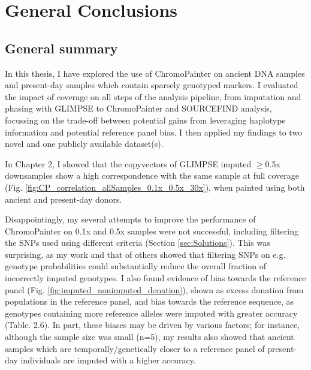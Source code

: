 \chapter{General Conclusions}
\label{chapterlabelConclusions}

\section{General summary}

In this thesis, I have explored the use of ChromoPainter on ancient DNA samples and present-day samples which contain sparsely genotyped markers. I evaluated the impact of coverage on all steps of the analysis pipeline, from imputation and phasing with GLIMPSE \cite{rubinacci2021efficient} to ChromoPainter and SOURCEFIND analysis, focussing on the trade-off between potential gains from leveraging haplotype information and potential reference panel bias. I then applied my findings to two novel and one publicly available dataset(s). 

In Chapter 2, I showed that the copyvectors of GLIMPSE imputed $\geq$0.5x downsamples show a high correspondence with the same sample at full coverage (Fig. \ref{fig:CP_correlation_allSamples_0.1x_0.5x_30x}), when painted using both ancient and present-day donors. 

Disappointingly, my several attempts to improve the performance of ChromoPainter on 0.1x and 0.5x samples were not successful, including filtering the SNPs used using different criteria (Section \ref{sec:Solutions}). This was surprising, as my work and that of others \cite{hui2020evaluating} showed that filtering SNPs on e.g. genotype probabilities could substantially reduce the overall fraction of incorrectly imputed genotypes. I also found evidence of bias towards the reference panel (Fig. \ref{fig:imputed_nonimputed_donation}), shown as excess donation from populations in the reference panel, and bias towards the reference sequence, as genotypes containing more reference alleles were imputed with greater accuracy (Table. 2.6). In part, these biases may be driven by various factors; for instance, although the sample size was small (n=5), my results also showed that ancient samples which are temporally/genetically closer to a reference panel of present-day individuals are imputed with a higher accuracy.


